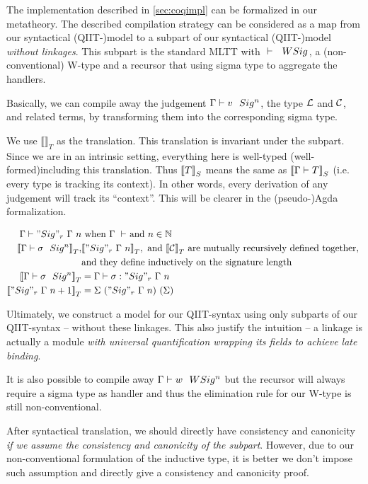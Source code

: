 The implementation described in \cref{sec:coqimpl} can be formalized in our metatheory. The described compilation strategy can be considered as a map from our syntactical (QIIT-)model to a subpart of our syntactical (QIIT-)model \textit{without linkages}. This subpart is the standard MLTT with ${ {} \vdash {} \ \ WSig^{} }$, a (non-conventional) W-type and a recursor that using sigma type to aggregate the handlers.  

Basically, we can compile away the judgement ${ {\Gamma} \vdash {v} \ \ Sig^{n} }$, the type ${\mathcal{L}}$ and ${\mathcal{C}}$, and related terms, by transforming them into the corresponding sigma type.

 

\newcommand{\denotesT}[1]{{{\llbracket {#1} \rrbracket}_T}}
\newcommand{\Sigr}[2]{{ "Sig"_r~{#1}~{#2} }}

We use $\denotesT{}$ as the translation. This translation is invariant under the subpart. Since we are in an intrinsic setting, everything here is well-typed (well-formed)including this translation. Thus ${{\llbracket {T} \rrbracket}_S}$ means the same as ${{\llbracket {{ {\Gamma} \vdash {T} }} \rrbracket}_S}$ (i.e. every type is tracking its context). In other words, every derivation of any judgement will track its ``context''. This will be clearer in the (pseudo-)Agda formalization.

\begin{align*}
  \goodType{\Gamma}{\Sigr{\Gamma}{n}}{} & \text{ when } \goodCtx{\Gamma}{} \text{ and } n \in \mathbb{N} \\
  \denotesT{\goodSig{\Gamma}{\sigma}{n}},&\denotesT{\Sigr{\Gamma}{n}}, \text{ and } \denotesT{\cC} \text{ are mutually recursively defined together, } \\
  & \text{and they define inductively on the signature length} \\  
  \denotesT{\goodSig{\Gamma}{\sigma}{n}} &= \goodTerm{\Gamma}{\sigma}{\Sigr{\Gamma}{n}} \\ 
  \denotesT{\Sigr{\Gamma}{n+1}} &= \Sigma~(\Sigr{\Gamma}{n})~(\Sigma)
\end{align*}



Ultimately, we construct a model for our QIIT-syntax using only subparts of our QIIT-syntax -- without these linkages. This also justify the intuition -- a linkage is actually a module \textit{with universal quantification wrapping its fields to achieve late binding}. 

It is also possible to compile away ${ {\Gamma} \vdash {w} \ \ WSig^{n} }$ but the recursor will always require a sigma type as handler and thus the elimination rule for our W-type is still non-conventional.

After syntactical translation, we should directly have consistency and canonicity \textit{if we assume the consistency and canonicity of the subpart}. However, due to our non-conventional formulation of the inductive type, it is better we don't impose such assumption and directly give a consistency and canonicity proof.
